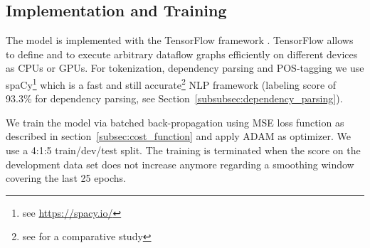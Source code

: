 \subsection{Implementation and Training}
\label{subesec:training_implementation}
The model is implemented with the TensorFlow framework  \autocite{abadi_tensorflow_2016}. TensorFlow allows to define and to execute arbitrary dataflow graphs efficiently on different devices as CPUs or GPUs. For tokenization, dependency parsing and POS-tagging we use spaCy\footnote{see \url{https://spacy.io/}} which is a fast and still accurate\footnote{see \textcite{choi_it_2015} for a comparative study} \ac{NLP} framework (labeling score of 93.3\% for dependency parsing, see Section~\ref{subsubsec:dependency_parsing}). 

We train the model via batched back-propagation using \ac{MSE} loss function as described in section~\ref{subsec:cost_function} and apply ADAM \autocite{kingma_adam_2014} %
as optimizer. We use a 4:1:5 train/dev/test split. The training is terminated when the score on the development data set does not increase anymore regarding a smoothing window covering the last 25 epochs.



\fi


